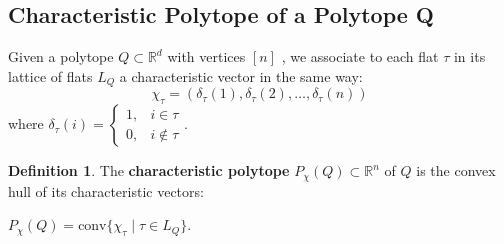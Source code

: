 \documentclass[12pt]{article}
\theoremstyle{definition}
\newtheorem{defi}[thm]{Definition}
\numberwithin{equation}{subsection}
\begin{document}
   
\subsection{Characteristic Polytope of a Polytope Q}
Given a polytope $Q \subset \mathbb{R}^{d}$ with vertices $[n]$ , we associate to each flat $\tau$ in its lattice of flats $L_{Q}$ a characteristic vector in the same way:
\[
\chi_{\tau} = (\delta_{\tau}(1), \delta_{\tau}(2), \ldots, \delta_{\tau}(n))
\]
where 
$\delta_{\tau}(i) = 
\begin{cases} 
1, & i \in \tau \\
0, & i \notin \tau
\end{cases}$.

\begin{defi}
    The \textbf{characteristic polytope} $P_{\chi}(Q) \subset \mathbb{R}^{n}$ of $Q$ is the convex hull of its characteristic vectors:
\begin{center}
    $P_{\chi}(Q) = \text{conv} \{\chi_{\tau} \mid \tau \in L_{Q}\}$.
\end{center}

\end{defi}
\end{document}
